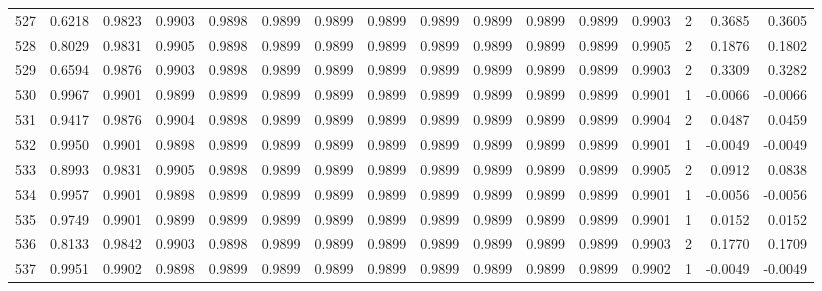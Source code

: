 \begin{tabular}{lrrrrrrrrrrrrrrr}
527 &      0.6218 &  0.9823 &  0.9903 &  0.9898 &  0.9899 &  0.9899 &  0.9899 &  0.9899 &  0.9899 &  0.9899 &   0.9899 &     0.9903 &      2 &                    0.3685 &                     0.3605 \\
528 &      0.8029 &  0.9831 &  0.9905 &  0.9898 &  0.9899 &  0.9899 &  0.9899 &  0.9899 &  0.9899 &  0.9899 &   0.9899 &     0.9905 &      2 &                    0.1876 &                     0.1802 \\
529 &      0.6594 &  0.9876 &  0.9903 &  0.9898 &  0.9899 &  0.9899 &  0.9899 &  0.9899 &  0.9899 &  0.9899 &   0.9899 &     0.9903 &      2 &                    0.3309 &                     0.3282 \\
530 &      0.9967 &  0.9901 &  0.9899 &  0.9899 &  0.9899 &  0.9899 &  0.9899 &  0.9899 &  0.9899 &  0.9899 &   0.9899 &     0.9901 &      1 &                   -0.0066 &                    -0.0066 \\
531 &      0.9417 &  0.9876 &  0.9904 &  0.9898 &  0.9899 &  0.9899 &  0.9899 &  0.9899 &  0.9899 &  0.9899 &   0.9899 &     0.9904 &      2 &                    0.0487 &                     0.0459 \\
532 &      0.9950 &  0.9901 &  0.9898 &  0.9899 &  0.9899 &  0.9899 &  0.9899 &  0.9899 &  0.9899 &  0.9899 &   0.9899 &     0.9901 &      1 &                   -0.0049 &                    -0.0049 \\
533 &      0.8993 &  0.9831 &  0.9905 &  0.9898 &  0.9899 &  0.9899 &  0.9899 &  0.9899 &  0.9899 &  0.9899 &   0.9899 &     0.9905 &      2 &                    0.0912 &                     0.0838 \\
534 &      0.9957 &  0.9901 &  0.9898 &  0.9899 &  0.9899 &  0.9899 &  0.9899 &  0.9899 &  0.9899 &  0.9899 &   0.9899 &     0.9901 &      1 &                   -0.0056 &                    -0.0056 \\
535 &      0.9749 &  0.9901 &  0.9899 &  0.9899 &  0.9899 &  0.9899 &  0.9899 &  0.9899 &  0.9899 &  0.9899 &   0.9899 &     0.9901 &      1 &                    0.0152 &                     0.0152 \\
536 &      0.8133 &  0.9842 &  0.9903 &  0.9898 &  0.9899 &  0.9899 &  0.9899 &  0.9899 &  0.9899 &  0.9899 &   0.9899 &     0.9903 &      2 &                    0.1770 &                     0.1709 \\
537 &      0.9951 &  0.9902 &  0.9898 &  0.9899 &  0.9899 &  0.9899 &  0.9899 &  0.9899 &  0.9899 &  0.9899 &   0.9899 &     0.9902 &      1 &                   -0.0049 &                    -0.0049 \\

\end{tabular}
